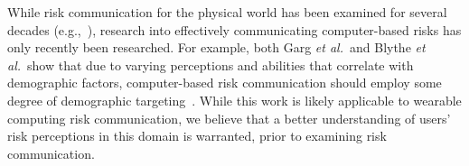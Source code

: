 While risk communication for the physical world has been examined for several decades (e.g.,~\cite{Fischhoff,Morgan2001}), research into effectively communicating computer-based risks has only recently been researched. For example, both Garg {\it et al.}\ and Blythe {\it et al.}\ show that due to varying perceptions and abilities that correlate with demographic factors, computer-based risk communication should employ some degree of demographic targeting~\cite{Garg2012,Blythe2011}. While this work is likely applicable to wearable computing risk communication, we believe that a better understanding of users' risk perceptions in this domain is warranted, prior to examining risk communication.